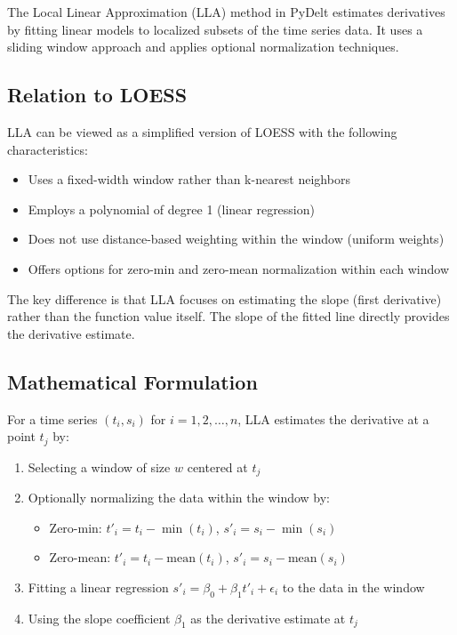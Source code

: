 \documentclass{article}
\begin{document}
The Local Linear Approximation (LLA) method in PyDelt estimates derivatives by fitting linear models to localized subsets of the time series data. It uses a sliding window approach and applies optional normalization techniques.

\subsection{Relation to LOESS}

LLA can be viewed as a simplified version of LOESS with the following characteristics:

\begin{itemize}
    \item Uses a fixed-width window rather than k-nearest neighbors
    \item Employs a polynomial of degree 1 (linear regression)
    \item Does not use distance-based weighting within the window (uniform weights)
    \item Offers options for zero-min and zero-mean normalization within each window
\end{itemize}

The key difference is that LLA focuses on estimating the slope (first derivative) rather than the function value itself. The slope of the fitted line directly provides the derivative estimate.

\subsection{Mathematical Formulation}

For a time series $(t_i, s_i)$ for $i = 1, 2, \ldots, n$, LLA estimates the derivative at a point $t_j$ by:

\begin{enumerate}
    \item Selecting a window of size $w$ centered at $t_j$
    \item Optionally normalizing the data within the window by:
    \begin{itemize}
        \item Zero-min: $t'_i = t_i - \min(t_i)$, $s'_i = s_i - \min(s_i)$
        \item Zero-mean: $t'_i = t_i - \text{mean}(t_i)$, $s'_i = s_i - \text{mean}(s_i)$
    \end{itemize}
    \item Fitting a linear regression $s'_i = \beta_0 + \beta_1 t'_i + \epsilon_i$ to the data in the window
    \item Using the slope coefficient $\beta_1$ as the derivative estimate at $t_j$
\end{enumerate}
\end{document}
